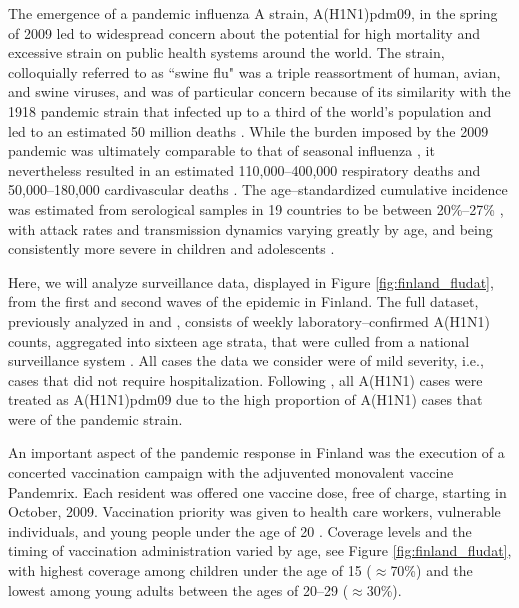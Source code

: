 The emergence of a pandemic influenza A strain, A(H1N1)pdm09, in the spring of 2009 led to widespread concern about the potential for high mortality and excessive strain on public health systems around the world. The strain, colloquially referred to as ``swine flu" was a triple reassortment of human, avian, and swine viruses, and was of particular concern because of its similarity with the 1918 pandemic strain that infected up to a third of the world's population and led to an estimated 50 million deaths \cite{cdc1918pandemic}. While the burden imposed by the 2009 pandemic was ultimately comparable to that of seasonal influenza \cite{iuliano2018estimates}, it nevertheless resulted in an estimated 110,000--400,000 respiratory deaths and 50,000--180,000 cardivascular deaths \cite{dawood2012estimated}. The age--standardized cumulative incidence was estimated from serological samples in 19 countries to be between 20\%--27\% \cite{van2013estimating}, with attack rates and transmission dynamics varying greatly by age, and being consistently more severe in children and adolescents \cite{opatowski2011transmission,steens2011age,van2013estimating,yang2015inference}. 

Here, we will analyze surveillance data, displayed in Figure \ref{fig:finland_fludat}, from the first and second waves of the epidemic in Finland. The full dataset, previously analyzed in \cite{shubin2014estimating} and \cite{shubin2016revealing}, consists of weekly laboratory--confirmed A(H1N1) counts, aggregated into sixteen age strata, that were culled from a national surveillance system \cite{lyytikainen2011surveillance}. All cases the data we consider were of mild severity, i.e., cases that did not require hospitalization. Following \cite{shubin2014estimating,shubin2016revealing}, all A(H1N1) cases were treated as A(H1N1)pdm09 due to the high proportion of A(H1N1) cases that were of the pandemic strain. 

An important aspect of the pandemic response in Finland was the execution of a concerted vaccination campaign with the adjuvented monovalent vaccine Pandemrix. Each resident was offered one vaccine dose, free of charge, starting in October, 2009. Vaccination priority was given to health care workers, vulnerable individuals, and young people under the age of 20 \cite{syrjanen2014effectiveness}.  Coverage levels and the timing of vaccination administration varied by age, see Figure \ref{fig:finland_fludat}, with highest coverage among children under the age of 15 ($ \approx $70\%) and the lowest among young adults between the ages of 20--29 ($ \approx $30\%). 

